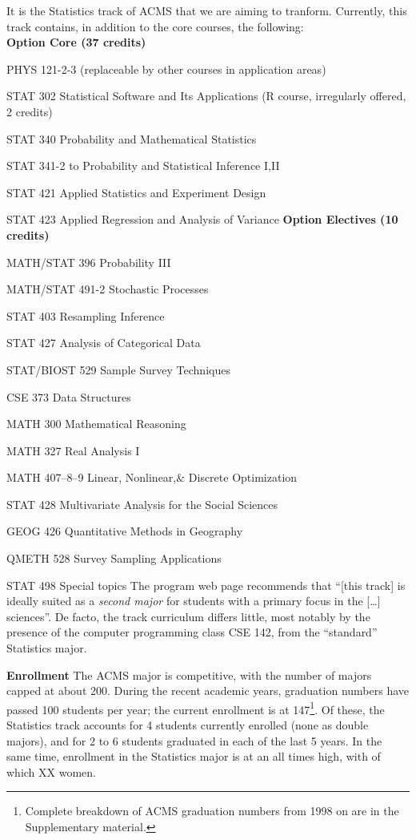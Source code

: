 It is the Statistics track of ACMS that we are aiming to
tranform. Currently, this track contains, in addition to the core
courses, the following:
\\
{\bf Option Core (37 credits)}
\bits
    \item {\sc PHYS 121-2-3} (replaceable by other courses in application areas)
    \item {\sc STAT 302} Statistical Software and Its Applications (R course, irregularly offered, 2 credits)
    \item {\sc STAT 340} Probability and Mathematical Statistics
    \item {\sc STAT 341-2} to Probability and Statistical Inference I,II
    \item {\sc STAT 421} Applied Statistics and Experiment Design
    \item {\sc STAT 423} Applied Regression and Analysis of Variance
\eits
{\bf Option Electives (10 credits)}
\bits
    \item {\sc MATH/STAT 396} Probability III
    \item {\sc MATH/STAT 491-2} Stochastic Processes
    \item {\sc STAT 403}  Resampling Inference
    \item {\sc STAT 427}  Analysis of Categorical Data
    \item {\sc STAT/BIOST 529} Sample Survey Techniques
    \item {\sc CSE 373} Data Structures
    \item {\sc MATH 300} Mathematical Reasoning
    \item {\sc MATH 327}  Real Analysis I
    \item {\sc MATH 407--8--9} Linear, Nonlinear,\& Discrete Optimization
    \item {\sc STAT 428} Multivariate Analysis for the Social Sciences
    \item {\sc GEOG 426} Quantitative Methods in Geography
    \item {\sc QMETH 528} Survey Sampling Applications
    \item {\sc STAT 498} Special topics
\eits
The program web page recommends that ``[this track] is ideally suited as a {\em second major} for students with a primary focus in the [\ldots] sciences''.
De facto, the track curriculum differs little, most notably by the
presence of the computer programming class {\sc CSE 142}, from the
``standard'' Statistics major.

{\bf Enrollment} The ACMS major is competitive, with the number of
majors capped at about 200.  During the recent academic years,
graduation numbers have passed 100 students per year; the current
enrollment is at 147\footnote{Complete breakdown of ACMS graduation
  numbers from 1998 on are in the Supplementary material.}.  Of these,
the Statistics track accounts for 4 students currently enrolled (none
as double majors), and for 2 to 6 students graduated in each of the
last 5 years. In the same time, enrollment in the Statistics major is
at an all times high, with  of which XX women.

